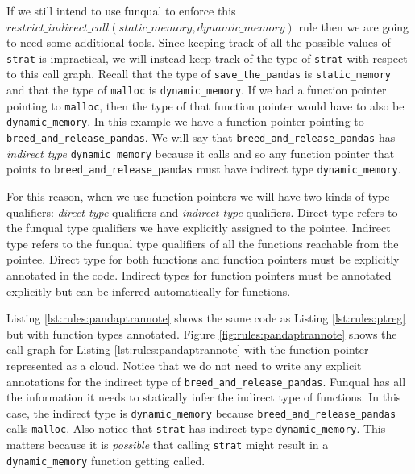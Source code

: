\begin{sloppypar}
If we still intend to use funqual to enforce this $restrict\_indirect\_call(\allowbreak static\_memory, dynamic\_memory)$ rule then we are going to need some additional tools.  Since keeping track of all the possible values of \lstinline{strat} is impractical, we will instead keep track of the type of \lstinline{strat} with respect to this call graph.  Recall that the type of \lstinline{save_the_pandas} is \lstinline{static_memory} and that the type of \lstinline{malloc} is \lstinline{dynamic_memory}.  If we had a function pointer pointing to \lstinline{malloc}, then the type of that function pointer would have to also be \lstinline{dynamic_memory}.  In this example we have a function pointer pointing to \lstinline{breed_and_release_pandas}.  We will say that \lstinline{breed_and_release_pandas} has \textit{indirect type} \lstinline{dynamic_memory} because it calls  and so any function pointer that points to \lstinline{breed_and_release_pandas} must have indirect type \lstinline{dynamic_memory}.
\end{sloppypar}

For this reason, when we use function pointers we will have two kinds of type qualifiers:  \textit{direct type} qualifiers and \textit{indirect type} qualifiers.  Direct type refers to the funqual type qualifiers we have explicitly assigned to the pointee.  Indirect type refers to the funqual type qualifiers of all the functions reachable from the pointee.  Direct type for both functions and function pointers must be explicitly annotated in the code.  Indirect types for function pointers must be annotated explicitly but can be inferred automatically for functions. 

Listing \ref{lst:rules:pandaptrannote} shows the same code as Listing \ref{lst:rules:ptreg} but with function types annotated.  Figure \ref{fig:rules:pandaptrannote} shows the call graph for Listing \ref{lst:rules:pandaptrannote} with the function pointer represented as a cloud.  Notice that we do not need to write any explicit annotations for the indirect type of \lstinline{breed_and_release_pandas}.  Funqual has all the information it needs to statically infer the indirect type of functions.  In this case, the indirect type is \lstinline{dynamic_memory} because \lstinline{breed_and_release_pandas} calls \lstinline{malloc}.  Also notice that \lstinline{strat} has indirect type \lstinline{dynamic_memory}.  This matters because it is \textit{possible} that calling \lstinline{strat} might result in a \lstinline{dynamic_memory} function getting called.  

